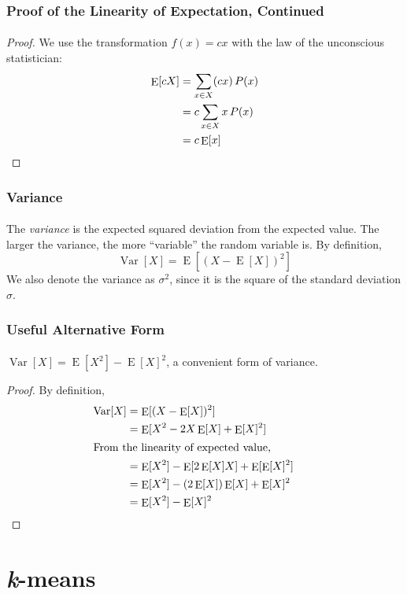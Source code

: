 \documentclass{beamer}                             %
\DeclareMathOperator{\E}{E}
\DeclareMathOperator{\Var}{Var}
\begin{document}
\begin{frame}
\frametitle{Proof of the Linearity of Expectation, Continued}
\framesubtitle{}
\begin{proof}
  We use the transformation \( f(x) = cx \)
  with the law of the unconscious statistician:
  \begin{align*}   
    \E[cX] &= \sum_{x \in X} (cx) \, P(x) \\
           &= c \sum_{x \in X} x  \, P(x) \\
           &= c \E[x] \qedhere
  \end{align*}
\end{proof}
\end{frame}

\begin{frame}
\frametitle{Variance}
\framesubtitle{}
\begin{definition}
  The \textit{variance} is the expected squared deviation from the
  expected value. The larger the variance, the more \enquote{variable}
  the random variable is. By definition, \[ \Var[X] = \E[(X - \E[X])^2]
  \] We also denote the variance as \( \sigma^2 \), since it is the
  square of the standard deviation \( \sigma \).
\end{definition}
\end{frame}

\begin{frame}
\frametitle{Useful Alternative Form}
\framesubtitle{}
\begin{theorem}
  \( \Var[X] = \E[X^2] - \E[X]^2 \), a convenient form of variance.
\end{theorem}
\begin{proof}
  By definition,
  \begin{align*}
    \Var[X] &= \E[(X - \E[X])^2] \\
            &= \E[X^2 - 2 X \E[X] + \E[X]^2]  \\
    \shortintertext{From the linearity of expected value,}
            &= \E[X^2] - \E[2 \E[X] X] + \E[\E[X]^2] \\ 
            &= \E[X^2] - (2 \E[X]) \E[X] + \E[X]^2 \\
            &= \E[X^2] - \E[X]^2 && \qedhere
  \end{align*}
\end{proof}
\end{frame}

\section{\textit{k}-means}
\end{document}
